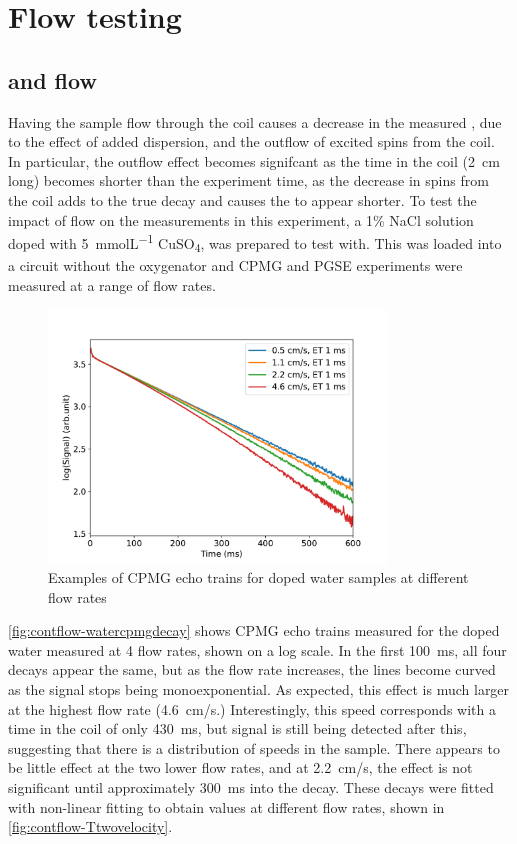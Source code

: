 \section{Flow testing}
\subsection{\Ttwo and flow}
\label{sec:contflow-Ttwoflow}
Having the sample flow through the coil causes a decrease in the measured \Ttwo, due to the effect of added dispersion, and the outflow of excited spins from the coil.
In particular, the outflow effect becomes signifcant as the time in the coil (\SI{2}{cm} long) becomes shorter than the experiment time, as the decrease in spins from the coil adds to the true \Ttwo decay and causes the \Ttwo to appear shorter.
To test the impact of flow on the \Ttwo measurements in this experiment, a 1\% NaCl solution doped with \SI{5}{mmolL^{-1}} CuSO\textsubscript{4}, was prepared to test with.
This was loaded into a circuit without the oxygenator and CPMG and PGSE experiments were measured at a range of flow rates.

\begin{figure}[ht]
\centering
\includegraphics[width=0.8\textwidth]{figures/contflow/dopedwatercpmgdecay.pdf}
\caption{Examples of CPMG echo trains for doped water samples at different flow rates}
\label{fig:contflow-watercpmgdecay}
\end{figure}

\autoref{fig:contflow-watercpmgdecay} shows CPMG echo trains measured for the doped water measured at 4 flow rates, shown on a log scale.
In the first \SI{100}{ms}, all four decays appear the same, but as the flow rate increases, the lines become curved as the signal stops being monoexponential.
As expected, this effect is much larger at the highest flow rate (\SI{4.6}{cm/s}.)
Interestingly, this speed corresponds with a time in the coil of only \SI{430}{ms}, but signal is still being detected after this, suggesting that there is a distribution of speeds in the sample.
There appears to be little effect at the two lower flow rates, and at \SI{2.2}{cm/s}, the effect is not significant until approximately \SI{300}{ms} into the decay.
These decays were fitted with non-linear fitting to obtain \Ttwo values at different flow rates, shown in \autoref{fig:contflow-Ttwovelocity}.

